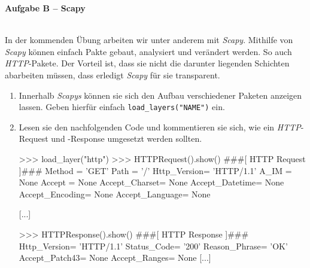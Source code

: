 \documentclass[paper=a4,fontsize=11pt]{scrartcl}%
\numberwithin{equation}{section}
\begin{document}
\begin{center}\Large{\textbf{Aufgabe B -- Scapy}}\end{center}
~\\
In der kommenden Übung arbeiten wir unter anderem mit \emph{Scapy}. Mithilfe von \emph{Scapy} können einfach Pakte gebaut, analysiert und verändert werden. So auch \emph{HTTP}-Pakete. Der Vorteil ist, dass sie nicht die darunter liegenden Schichten abarbeiten müssen, dass erledigt \emph{Scapy} für sie transparent.
\begin{enumerate}
	\item Innerhalb \emph{Scapys} können sie sich den Aufbau verschiedener Paketen anzeigen lassen. Geben hierfür einfach \texttt{load\_layers("NAME")} ein.
	\item Lesen sie den nachfolgenden Code und kommentieren sie sich, wie ein \emph{HTTP}-Request und -Response umgesetzt werden sollten.
	\begin{python}
>>> load_layer("http")
>>> HTTPRequest().show()
###[ HTTP Request ]### 
  Method    = 'GET'
  Path      = '/'
  Http_Version= 'HTTP/1.1'
  A_IM      = None
  Accept    = None
  Accept_Charset= None
  Accept_Datetime= None
  Accept_Encoding= None
  Accept_Language= None

  [...]
\end{python} 


\begin{python}
>>> HTTPResponse().show()
###[ HTTP Response ]###
  Http_Version= 'HTTP/1.1'
  Status_Code= '200'
  Reason_Phrase= 'OK'
  Accept_Patch43= None
  Accept_Ranges= None
  [...]
\end{python}
\end{enumerate}
\end{document}
